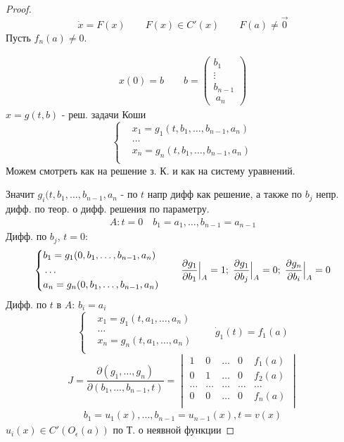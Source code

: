 \documentclass{article}
\begin{document}
\begin{proof}
  \[
    \dot{x}=F(x) \qquad F(x) \in C'(x) \qquad F(a)\neq \vec{0}
  \]
  Пусть $f_n(a)\neq0$.

  \begin{gather*}
    x(0)=b \qquad b = \begin{pmatrix}
      b_1 \\ \vdots \\ b_{n-1} \\\ a_n
    \end{pmatrix}
  \end{gather*}
  $x=g(t,b)$ - реш. задачи Коши
  \[
    \left\{\begin{aligned}
      & x_1 = g_1(t, b_1, \dots , b_{n-1}, a_n) \\ 
      & \dots \\
      & x_n = g_n(t, b_1, \dots , b_{n-1}, a_n) \\ 
    \end{aligned}\right.
  \]
  Можем смотреть как на решение з. К. и как на систему уравнений.

  Значит $g_i(t,b_1,\dots ,b_{n-1},a_n$ - по $t$ напр дифф как решение,
  а также по $b_j$ непр. дифф. по теор. о дифф. решения по параметру.
  \begin{gather*}
    A: t=0 \quad b_1=a_1, \dots , b_{n-1}=a_{n-1}
  \end{gather*}
  Дифф. по $b_j$, $t=0$:
  \[
    \left\{\begin{aligned}
      & b_1=g_1(0,b_1,\dots ,b_{n-1},a_n) \\ 
      & \dots \\ 
      & a_n=g_n(0,b_1,\dots ,b_{n-1},a_n) \\ 
    \end{aligned}\right. \qquad 
    \frac{\partial{g_1}}{\partial{b_1}}\Big|_{A}=1; \; \frac{\partial{g_1}}{\partial{b_j}}\Big|_{A}=0;\; \frac{\partial{g_n}}{\partial{b_i}}\Big|_{A}=0
  \]
  Дифф. по $t$ в $A$: $b_i=a_i$
  \[
    \left\{\begin{aligned}
      & x_1=g_1(t,a_1,\dots ,a_n) \\ 
      & \dots \\
      & x_n=g_n(t,a_1,\dots ,a_n) \\ 
    \end{aligned}\right. \qquad \dot{g}_1(t)=f_1(a)
  \]
  \[
    J=\frac{\partial(g_1,\dots ,g_n)}{\partial(b_1,\dots ,b_{n-1},t)}=\begin{vmatrix}
      1 & 0 & \dots & 0 & f_1(a) \\
      0 & 1 & \dots & 0 & f_2(a) \\
      \dots & \dots & \dots & \dots & \dots \\
      0 & 0 & \dots & 0 & f_n(a) \\
    \end{vmatrix}
  \]
  \begin{gather*}
    b_1=u_1(x),\dots ,b_{n-1}=u_{n-1}(x), t=v(x)
  \end{gather*}
  $u_i(x) \in C'(O_{\epsilon}(a))$ по Т. о неявной функции
  

\end{proof}
\end{document}
